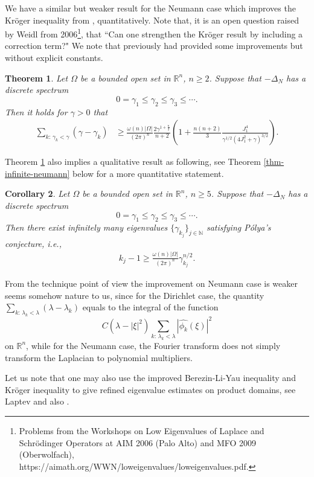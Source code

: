 \documentclass[11pt,twoside, leqno]{article}
\def\rr{{\mathbb R}}
\def\rn{{{\rr}^n}}
\newtheorem{thm}{Theorem}[section]
\newtheorem{cor}[thm]{Corollary}
\numberwithin{equation}{section}
\begin{document}
We have a similar but weaker result for the Neumann case which improves the Kr\"oger inequality from \cite{Kroger92}, quantitatively.
Note that,  it is an open question raised by Weidl from 2006\footnote[1]{Problems from the Workshops on
Low Eigenvalues  of Laplace and Schr\"odinger Operators
at AIM 2006 (Palo Alto) and MFO 2009 (Oberwolfach), https://aimath.org/WWN/loweigenvalues/loweigenvalues.pdf.},
that ``Can one strengthen the Kr\"oger result by including a correction term?" We note that previously \cite{FL24a,LT06}
had provided some improvements but without explicit constants.
\begin{thm}\label{Neumann}
Let $\Omega$ be a bounded open set in $\rn$, $n\ge 2$. Suppose that $-\Delta_N$ has a discrete spectrum
$$0= \gamma_1\le \gamma_2\le \gamma_3\le \cdots.$$ Then
it holds  for $\gamma>0$ that
\begin{align}\label{riesz-neumann}
\sum_{k:\,\gamma_k<\gamma} (\gamma-\gamma_k)&\ge  \frac{\omega(n)|\Omega|}{(2\pi)^{n}} \frac{2\gamma^{1+\frac n2}}{n+2}\left(1+\frac{n(n+2) }{3 } \frac{J_1^4}{\gamma^{1/2} (4J_1^2+\gamma)^{3/2}}\right).
\end{align}
\end{thm}
Theorem \ref{Neumann} also implies a qualitative result as following, see Theorem \ref{thm-infinite-neumann} below for a more quantitative statement.
\begin{cor}\label{cor-infinite-neumann}
Let $\Omega$ be a bounded open set in $\rn$, $n\ge 5$. Suppose that $-\Delta_N$ has a discrete spectrum
$$0= \gamma_1\le \gamma_2\le \gamma_3\le \cdots.$$
Then there exist infinitely many eigenvalues $\{\gamma_{k_j}\}_{j\in\mathbb{N}}$ satisfying P\'olya's conjecture, i.e.,
\begin{align}
 k_{j}- 1\ge \frac{\omega(n)|\Omega|}{(2\pi)^{n}} \gamma_{k_j}^{n/2}.
\end{align}
\end{cor}
From the technique point of view the improvement on Neumann case is weaker seems somehow nature to us, since
for the Dirichlet case, the quantity $\sum_{k:\,\lambda_k<\lambda}(\lambda-\lambda_k)$ equals to the integral of the function
$$C(\lambda-|\xi|^2)\sum_{k:\,\lambda_k<\lambda}|\hat{\phi_k}(\xi)|^2$$
on $\rn$,
while for the Neumann case, the Fourier transform does not simply transform the Laplacian to polynomial multipliers.

Let us note that one may also use the improved Berezin-Li-Yau inequality and Kr\"oger inequality to give refined eigenvalue estimates
on product domains, see Laptev \cite{La97} and also \cite{JL25,Larson17}.
\end{document}
